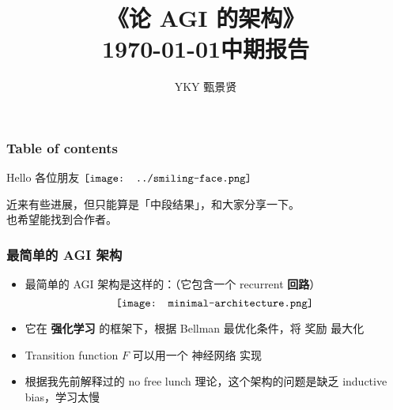 \documentclass[15pt]{beamer}
\title[On AGI architecture]{\Huge《论 AGI 的架构》\\{\footnotesize \today 中期报告}} %
\author{YKY 甄景贤} %
\institute[] %
{
Independent researcher, Hong Kong \\ %
\medskip
\textit{generic.intelligence@gmail.com} %
}
\date{} %
\makeatletter
\renewcommand{\smiley}{$\vcenter{\hbox{\texttt{[image: ../smiling-face.png]}}}$}
\newif\ifframeinlbf
\newcommand\listofframes{\@starttoc{lbf}}
\makeatother
\begin{document}
\frameinlbffalse
\frame{\titlepage}

\begin{frame}
\frametitle{Table of contents}
\listofframes
\vspace*{0.5cm}
Hello 各位朋友 \smiley

近来有些进展，但只能算是「中段结果」，和大家分享一下。 \\
也希望能找到合作者。
\end{frame}

%
%




\frameinlbftrue
\begin{frame}
\frametitle{最简单的 AGI 架构}
\begin{itemize}
	\item 最简单的 AGI 架构是这样的：（它包含一个 recurrent \textbf{回路}）
		\begin{equation}
		\vcenter{\hbox{\texttt{[image: minimal-architecture.png]}}}
		\end{equation}
	\item 它在 \textbf{强化学习} 的框架下，根据 Bellman 最优化条件，将 奖励 最大化
	\item Transition function $F$ 可以用一个 神经网络 实现
	\item 根据我先前解释过的 no free lunch 理论，这个架构的问题是缺乏 inductive bias，学习太慢
\end{itemize}
\end{frame}
\end{document}
